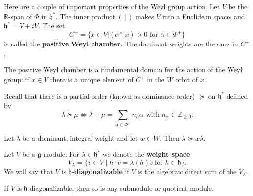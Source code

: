 \documentclass[12pt]{article}
\begin{document}
Here are a couple of important properties of the Weyl group action. Let $V$ be the $\mathbb{R}$-span of $\Phi$ in $\mathfrak{h}^*$. The inner product $(\,|\,)$ makes $V$ into a Euclidean space, and $\mathfrak{h}^* = V + iV$. The set
\[
    C^+ = \{ x \in V | (\alpha^\vee|x) > 0 \text{ for } \alpha \in \Phi^+ \}
\]
is called the \textbf{positive Weyl chamber}. The dominant weights are the ones in $C^+$.

\begin{proposition}\label{prop:fundamental_domain}
    The positive Weyl chamber is a fundamental domain for the action of the Weyl group:
    if $x \in V$ there is a unique element of $C^+$ in the $W$ orbit of $x$.
\end{proposition}

Recall that there is a partial order (known as dominance order) $\succeq$ on $\mathfrak{h}^*$ defined by
\[
    \lambda \succeq \mu \iff \lambda - \mu = \sum_{\alpha \in \Phi^+} n_\alpha \alpha \text{ with } n_\alpha \in \mathbb{Z}_{\geq 0}.
\]
\begin{proposition}
    Let $\lambda$ be a dominant, integral weight and let $w \in W$. Then $\lambda \succeq w\lambda$.
\end{proposition}
Let $V$ be a $\mathfrak{g}$-module. For $\lambda \in \mathfrak{h}^*$ we denote the \textbf{weight space}
\[
    V_\lambda = \{ v \in V \mid h \cdot v = \lambda(h)v \ \text{for } h \in \mathfrak{h} \}.
\]
We will say that $V$ is $\mathfrak{h}$-\textbf{diagonalizable} if $V$ is the algebraic direct sum of the $V_\lambda$.

\begin{proposition}
    If $V$ is $\mathfrak{h}$-diagonalizable, then so is any submodule or quotient module.
\end{proposition}
\end{document}
